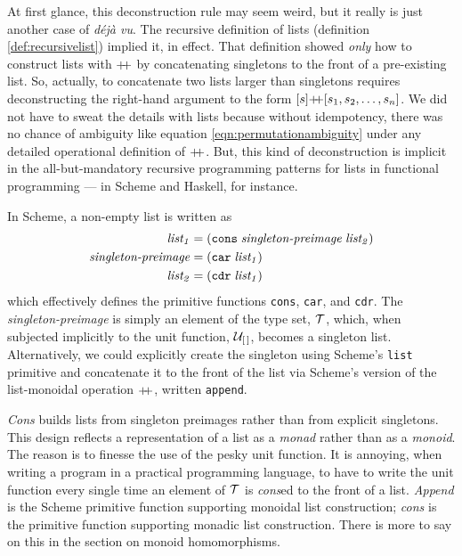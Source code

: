 At first glance, this deconstruction rule may seem weird, but it really is just another case of \emph{d\'ej\`a vu}. The recursive definition of lists (definition \ref{def:recursivelist}) implied it, in effect. That definition showed \emph{only} how to construct lists with $\pp$ by concatenating singletons to the front of a pre-existing list. So, actually, to concatenate two lists larger than singletons requires deconstructing the right-hand argument to the form $[s]\pp[s_1,s_2,\ldots,s_n]$. We did not have to sweat the details with lists because without idempotency, there was no chance of ambiguity like equation \ref{eqn:permutationambiguity} under any detailed operational definition of $\pp$. But, this kind of deconstruction is implicit in the all-but-mandatory recursive programming patterns for lists in functional programming --- in Scheme and Haskell, for instance.


In Scheme, a non-empty list is written as
\begin{align*}
  \mathit{list_1} &= \mathtt{(cons}\; \text{\emph{singleton-preimage}}\; \mathit{list_2}\mathtt{)}\\
  \text{\emph{singleton-preimage}} &= \mathtt{(car}\; \mathit{list_1}\mathtt{)}\\
  \mathit{list_2} &= \mathtt{(cdr}\; \mathit{list_1}\mathtt{)}
\end{align*}
which effectively defines the primitive functions \verb"cons", \verb"car", and \verb"cdr". The \emph{singleton-preimage} is simply an element of the type set, $\mathcal{T}$, which, when subjected implicitly to the unit function, $\mathcal{U}_{[\,]}$, becomes a singleton list. Alternatively, we could explicitly create the singleton using Scheme's \verb"list" primitive and concatenate it to the front of the list via Scheme's version of the list-monoidal operation $\pp$, written \verb"append".


\emph{Cons} builds lists from singleton preimages rather than from explicit singletons. This design reflects a representation of a list as a \emph{monad} rather than as a \emph{monoid}. The reason is to finesse the use of the pesky unit function. It is annoying, when writing a program in a practical programming language, to have to write the unit function every single time an element of $\mathcal{T}$ is \emph{cons}ed to the front of a list. \emph{Append} is the Scheme primitive function supporting monoidal list construction; \emph{cons} is the primitive function supporting monadic list construction. There is more to say on this in the section on monoid homomorphisms.


